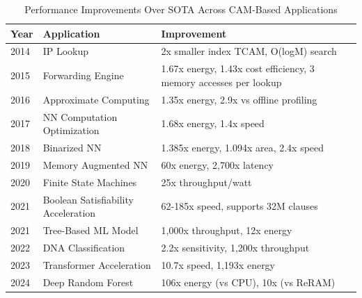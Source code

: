 \begin{table}[t]
\centering
\caption{Performance Improvements Over SOTA Across CAM-Based Applications}
\label{tab:fom}
\begin{tabular}{|l|p{3.3cm}|p{4.3cm}|}
\hline
\textbf{Year} & \textbf{Application} & \textbf{Improvement} \\ \hline
2014 & IP Lookup \cite{app_2014} & 2x smaller index TCAM, O(logM) search \\ \hline
2015 & Forwarding Engine \cite{app_2015} & 1.67x energy, 1.43x cost efficiency, 3 memory accesses per lookup \\ \hline
2016 & Approximate Computing \cite{app_2016} & 1.35x energy, 2.9x vs offline profiling \\ \hline
2017 & NN Computation Optimization \cite{app_2017} & 1.68x energy, 1.4x speed \\ \hline
2018 & Binarized NN \cite{app_2018} & 1.385x energy, 1.094x area, 2.4x speed \\ \hline
2019 & Memory Augmented NN \cite{FeFET_4} & 60x energy, 2,700x latency \\ \hline
2020 & Finite State Machines \cite{app_2020} & 25x throughput/watt \\ \hline
2021 & Boolean Satisfiability Acceleration \cite{app_2021_SAT} & 62-185x speed, supports 32M clauses \\ \hline
2021 & Tree-Based ML Model \cite{app_AI_3} & 1,000x throughput, 12x energy \\ \hline
2022 & DNA Classification \cite{app_gen_2} & 2.2x sensitivity, 1,200x throughput \\ \hline
2023 & Transformer Acceleration \cite{app_AI_4} & 10.7x speed, 1,193x energy \\ \hline
2024 & Deep Random Forest \cite{app_2024} & 106x energy (vs CPU), 10x (vs ReRAM) \\ \hline
\end{tabular}
\end{table}
